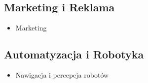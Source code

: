 \subsection*{Marketing i Reklama}
\begin{itemize}
	\item Marketing\cite{marketingXAIexample}
\end{itemize}
\subsection*{Automatyzacja i Robotyka}
\begin{itemize}
	\item Nawigacja i percepcja robotów\cite{lover2021explainable}
\end{itemize}
